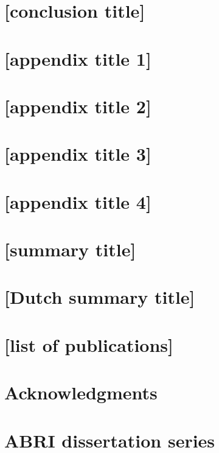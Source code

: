 \documentclass[12pt,openright,twoside]{book}
\numberwithin{equation}{chapter}
\begin{document}
\chapter{[conclusion title]} \label{ch:conclusion}


\appendix
\chapter{[appendix title 1]}
\graphicspath{{Paper 1/}} %


\chapter{[appendix title 2]}
\graphicspath{{Paper 2/}} %


\chapter{[appendix title 3]}
\graphicspath{{Paper 3/}} %


\chapter{[appendix title 4]}
\graphicspath{{Paper 4/}} %


\backmatter

\chapter{[summary title]}


\chapter{[Dutch summary title]}



\chapter{[list of publications]}


\chapter{Acknowledgments}


 

\chapter*{ABRI dissertation series}

\end{document}
